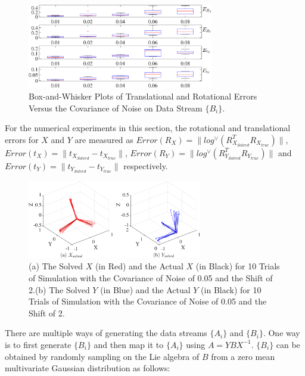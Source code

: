 \documentclass[letterpaper, 10 pt, conference]{ieeeconf}  %
\begin{document}
\begin{figure}
\centering
\includegraphics[width=3.2in]{fig3.eps}
\caption{
Box-and-Whisker Plots of Translational and Rotational Errors Versus the Covariance of Noise on Data Stream $\{B_i\}$.\vspace{6pt}
}
\label{fig3}
\end{figure}


For the numerical experiments in this section, the rotational and translational errors for $X$ and $Y$ are measured as  $Error(R_X) = \parallel log^{\vee} (R_{X_{Solved}}^{T}R_{X_{true}})\parallel$, $Error(t_X) = \parallel t_{X_{Solved}}-t_{X_{true}} \parallel$, $Error(R_Y) = \parallel log^{\vee} (R_{Y_{Solved}}^{T}R_{Y_{true}})\parallel$ and $Error(t_Y) = \parallel t_{Y_{Solved}}-t_{Y_{true}} \parallel$ respectively.

\begin{center}
\begin{figure}
\centering
\includegraphics[width=3in]{fig4.eps}
\caption{
(a) The Solved $X$ (in Red) and the Actual $X$ (in Black) for 10 Trials of Simulation with the Covariance of Noise of 0.05 and the Shift of 2.(b) The Solved $Y$ (in Blue) and the Actual $Y$ (in Black) for 10 Trials of Simulation with the Covariance of Noise of 0.05 and the Shift of 2.
}
\label{fig4}
\end{figure}
\end{center}

There are multiple ways of generating the data streams $\{A_i\}$ and $\{B_{i}\}$. One way is to first generate $\{B_i\}$ and then map it to $\{A_i\}$ using $A = YBX^{-1}$. $\{B_i\}$ can be obtained by randomly sampling on the Lie algebra of $B$ from a zero mean multivariate Gaussian distribution as follows:
\end{document}
